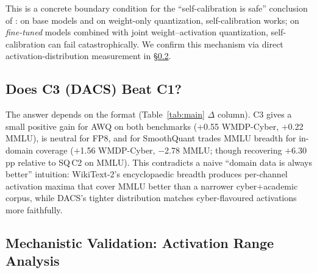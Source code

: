 \documentclass[11pt]{article}
\newcommand{\dacs}{DACS}
\newcommand{\wmdp}{WMDP-Cyber}
\begin{document}
This is a concrete boundary condition for the ``self-calibration is
safe'' conclusion of \citet{williams2025selfcalib}: on base models and
on weight-only quantization, self-calibration works; on
\emph{fine-tuned} models combined with joint weight--activation
quantization, self-calibration can fail catastrophically.  We confirm this mechanism via direct activation-distribution
measurement in \S\ref{sec:mechanism}.

\subsection{Does C3 (\dacs{}) Beat C1?}

The answer depends on the format (Table~\ref{tab:main} $\Delta$
column).  C3 gives a small positive gain for AWQ on both benchmarks
($+$0.55 \wmdp{}, $+$0.22 MMLU), is neutral for FP8, and for
SmoothQuant trades MMLU breadth for in-domain coverage ($+$1.56
\wmdp{}, $-$2.78 MMLU; though recovering $+$6.30\,pp relative to
SQ\,C2 on MMLU).  This contradicts a naive ``domain data is always
better'' intuition: WikiText-2's encyclopaedic breadth produces
per-channel activation maxima that cover MMLU better than a
narrower cyber+academic corpus, while \dacs{}'s tighter distribution
matches cyber-flavoured activations more faithfully.

\subsection{Mechanistic Validation: Activation Range Analysis}
\label{sec:mechanism}
\end{document}
